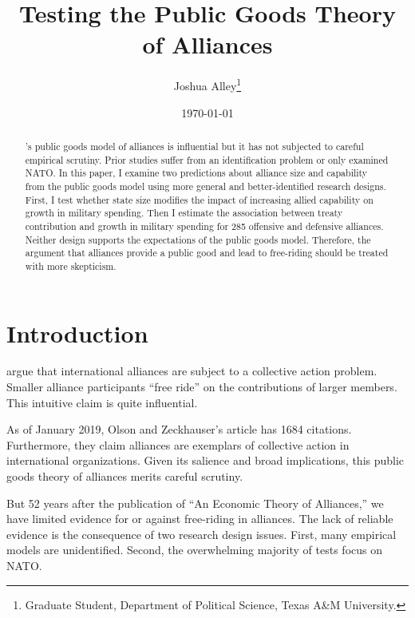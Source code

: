 \documentclass[12pt]{article}
\title{
\textbf{Testing the Public Goods Theory of Alliances}
	}
\author{Joshua Alley\footnote{Graduate Student,
Department of Political Science, Texas A\&M University.}}
\date{{\normalsize \today}}
\begin{document}
\maketitle 

\doublespace

\begin{abstract}
\citet{OlsonZeckhauser1966}'s public goods model of alliances is influential but it has not subjected to careful empirical scrutiny. 
Prior studies suffer from an identification problem or only examined NATO. 
In this paper, I examine two predictions about alliance size and capability from the public goods model using more general and better-identified research designs. 
First, I test whether state size modifies the impact of increasing allied capability on growth in military spending. 
Then I estimate the association between treaty contribution and growth in military spending for 285 offensive and defensive alliances. 
Neither design supports the expectations of the public goods model. 
Therefore, the argument that alliances provide a public good and lead to free-riding should be treated with more skepticism. 

\end{abstract} 



\section{Introduction}



\citet{OlsonZeckhauser1966} argue that international alliances are subject to a collective action problem. 
Smaller alliance participants ``free ride'' on the contributions of larger members. 
This intuitive claim is quite influential. 


As of January 2019, Olson and Zeckhauser's article has 1684 citations.
Furthermore, they claim alliances are exemplars of collective action in international organizations. 
Given its salience and broad implications, this public goods theory of alliances merits careful scrutiny. 


But 52 years after the publication of ``An Economic Theory of Alliances,'' we have limited evidence for or against free-riding in alliances. 
The lack of reliable evidence is the consequence of two research design issues. 
First, many empirical models are unidentified.
Second, the overwhelming majority of tests focus on NATO. 
\end{document}
